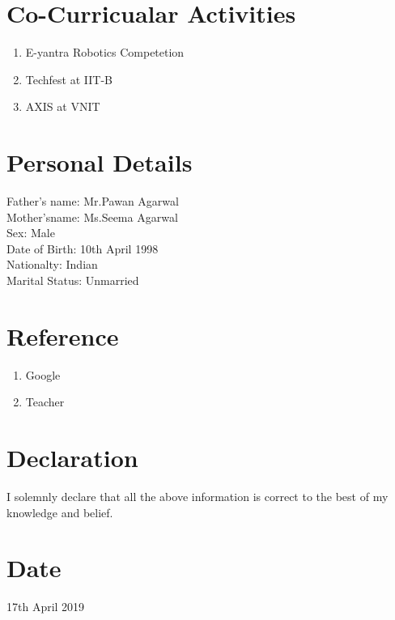 \documentclass{article}
\begin{document}
\section{Co-Curricualar Activities}
\begin{enumerate}
	\item E-yantra Robotics Competetion
	\item Techfest at IIT-B
	\item AXIS at VNIT
\end{enumerate}
\section{Personal Details}
Father's name: Mr.Pawan Agarwal \\
Mother'sname: Ms.Seema Agarwal \\
Sex: Male \\
Date of Birth: 10th April 1998\\
Nationalty: Indian\\
Marital Status: Unmarried\\
\section{Reference}
\begin{enumerate}
	\item Google
	\item Teacher
\end{enumerate}
\section{Declaration}
I solemnly declare that all the above information is correct to the best of my knowledge and belief.
\section{Date}
17th April 2019
\end{document}
